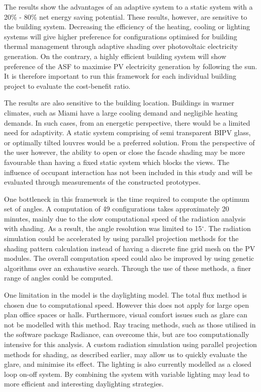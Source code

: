 
The results show the advantages of an adaptive system to a static system with a 20\% - 80\% net energy saving potential. These results, however, are sensitive to the building system. Decreasing the efficiency of the heating, cooling or lighting systems will give higher preference for configurations optimised for building thermal management through adaptive shading over photovoltaic electricity generation. On the contrary, a highly efficient building system will show preference of the ASF to maximise PV electricity generation by following the sun. It is therefore important to run this framework for each individual building project to evaluate the cost-benefit ratio.

The results are also sensitive to the building location. Buildings in warmer climates, such as Miami have a large cooling demand and negligible heating demands. In such cases, from an energetic perspective, there would be a limited need for adaptivity. A static system comprising of semi transparent BIPV glass, or optimally tilted louvres would be a preferred solution. From the perspective of the user however, the ability to open or close the facade shading may be more favourable than having a fixed static system which blocks the views. The influence of occupant interaction has not been included in this study and will be evaluated through measurements of the constructed prototypes.

One bottleneck in this framework is the time required to compute the optimum set of angles. A computation of 49 configurations takes approximately 20 minutes, mainly due to the slow computational speed of the radiation analysis with shading. As a result, the angle resolution was limited to 15$^{\circ}$. The radiation simulation could be accelerated by using parallel projection methods for the shading pattern calculation instead of having a discrete fine grid mesh on the PV modules. The overall computation speed could also be improved by using genetic algorithms over an exhaustive search. Through the use of these methods, a finer range of angles could be computed. 

One limitation in the model is the daylighting model. The total flux method is chosen due to computational speed. However this does not apply for large open plan office spaces or halls. Furthermore, visual comfort issues such as glare can not be modelled with this method. Ray tracing methods, such as those utilised in the software package Radiance, can overcome this, but are too computationally intensive for this analysis. A custom radiation simulation using parallel projection methods for shading, as described earlier, may allow us to quickly evaluate the glare, and minimise its effect. The lighting is also currently modelled as a closed loop on-off system. By combining the system with variable lighting may lead to more efficient and interesting daylighting strategies. 

